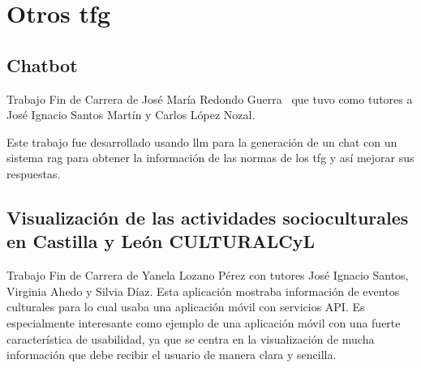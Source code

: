 \begin{table}[h]
	\centering
	\renewcommand{\arraystretch}{1.5} %
	\caption{Comparación de aplicaciones}
	\label{herramientasportipodeuso}
\end{table}



	
\section{Otros \acrfull{tfg}}
	\subsection{Chatbot}
	Trabajo Fin de Carrera de José María Redondo Guerra~\cite{chatbot_github} que tuvo como tutores a José Ignacio Santos Martín y Carlos López Nozal.
	
	Este trabajo fue desarrollado usando \acrfull{llm} para la generación de un chat con un sistema \acrshort{rag} para obtener la información de las normas de los \acrshort{tfg} y así mejorar sus respuestas.
	
	\subsection{Visualización de las actividades socioculturales en Castilla y León CULTURALCyL}
	Trabajo Fin de Carrera de Yanela Lozano Pérez con tutores José Ignacio Santos, Virginia Ahedo y Silvia Díaz.
	Esta aplicación mostraba información de eventos culturales para lo cual usaba una aplicación móvil con servicios API.
	Es especialmente interesante como ejemplo de una aplicación móvil con una fuerte característica de usabilidad, ya que se centra en la visualización de mucha información que debe recibir el usuario de manera clara y sencilla.